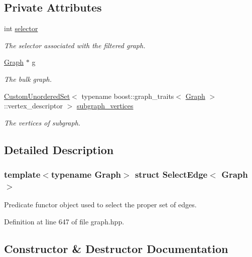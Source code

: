\subsection*{Private Attributes}
\begin{DoxyCompactItemize}
\item 
int \hyperlink{structSelectEdge_a6cb7ce5372b3f4b6de11374175cc4da9}{selector}
\begin{DoxyCompactList}\small\item\em The selector associated with the filtered graph. \end{DoxyCompactList}\item 
\hyperlink{structGraph}{Graph} $\ast$ \hyperlink{structSelectEdge_abf6c83f5f1757c9a5629b0228034e6fd}{g}
\begin{DoxyCompactList}\small\item\em The bulk graph. \end{DoxyCompactList}\item 
\hyperlink{classCustomUnorderedSet}{Custom\+Unordered\+Set}$<$ typename boost\+::graph\+\_\+traits$<$ \hyperlink{structGraph}{Graph} $>$\+::vertex\+\_\+descriptor $>$ \hyperlink{structSelectEdge_a1d90cd21db75b64a7a7585e8a9929d56}{subgraph\+\_\+vertices}
\begin{DoxyCompactList}\small\item\em The vertices of subgraph. \end{DoxyCompactList}\end{DoxyCompactItemize}


\subsection{Detailed Description}
\subsubsection*{template$<$typename Graph$>$\newline
struct Select\+Edge$<$ Graph $>$}

Predicate functor object used to select the proper set of edges. 

Definition at line 647 of file graph.\+hpp.



\subsection{Constructor \& Destructor Documentation}
\mbox{\label{structSelectEdge_a85fd1ba13a38152310e167ed546281de}} 
